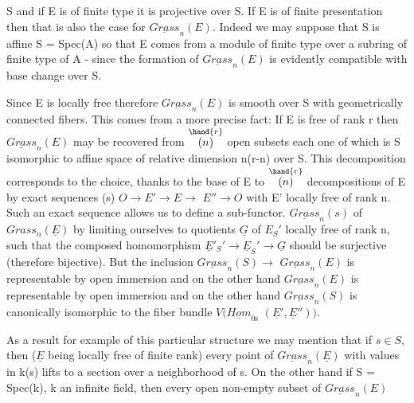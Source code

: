 
S and if E is of finite type it is projective over S.  If E is of
finite presentation then that is also the case for $\underline{Grass}_n(E)$.
Indeed we may suppose that S is affine S = Spec(A) so that E comes
from a module of finite type over a subring of finite type of A -
since the formation of $\underline{Grass}_n(E)$ is evidently compatible with base
change over S.

Since E is locally free therefore $\underline{Grass}_n(E)$ is smooth over S
with geometrically connected fibers.  This comes from a more
precise fact:  If E is free of rank r then $\underline{Grass}_n(E)$ may be
recovered from $\overset{\hand{r}}{\textstyle(n)}$ open subsets each one of which is S isomorphic
to affine space of relative dimension n(r-n) over S.  This
decomposition corresponds to the choice, thanks to the base of E
to $\overset{\hand{r}}{\textstyle(n)}$ decompositions of E by exact sequences (s) $O \to E' \to E \to$
$E'' \to O$ with E' locally free of rank n.  Such an exact sequence
allows us to define a sub-functor.  $\underline{Grass}_n(s)$ of $Grass_n(\underline{E})$ by
limiting ourselves to quotients $\underline{G}$ of $E_S{}'$ locally free of rank n,
such that the composed homomorphism $\underline{E}'_S{}' \to \underline{E}_S{}' \to \underline{G}$ should be
surjective (therefore bijective).  But the inclusion $\underline{Grass}_n(S) \to$
$\underline{Grass}_n(E)$ is representable by open immersion and on the other hand
$\underline{Grass}_n(E)$ is representable by open immersion and on the other hand
$\underline{Grass}_n(S)$ is canonically isomorphic to the fiber bundle $V(\underline{Hom}_{0\mathrm{s}}$
$(\underline{E}', \underline{E}''))$.

As a result for example of this particular structure we may
mention that if $s \in S$, then ($\underline{E}$ being locally free of finite rank)
every point of $\underline{Grass}_n(\underline{E})$ with values in k(s) lifts to a section
over a neighborhood of s.  On the other hand if S = Spec(k), k an
infinite field, then every open non-empty subset of $\underline{Grass}_n(E)$
